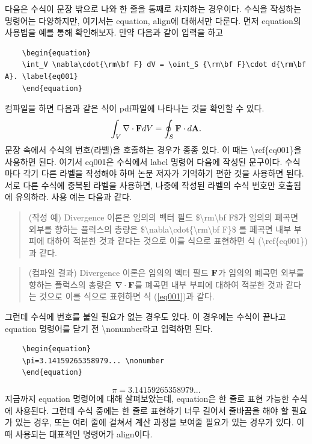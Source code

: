 \documentclass[twoside,11pt]{gshs_thesis}
\begin{document}
다음은 수식이 문장 밖으로 나와 한 줄을 통째로 차지하는 경우이다. 수식을 작성하는 명령어는 다양하지만, 여기서는 equation, align에 대해서만 다룬다. 먼저 equation의 사용법을 예를 통해 확인해보자. 만약 다음과 같이 입력을 하고
\begin{lstlisting}
	\begin{equation}
	\int_V \nabla\cdot{\rm\bf F} dV = \oint_S {\rm\bf F}\cdot d{\rm\bf A}. \label{eq001}
	\end{equation}
\end{lstlisting}
컴파일을 하면 다음과 같은 식이 pdf파일에 나타나는 것을 확인할 수 있다.
\begin{equation}
\int_V \nabla\cdot{\rm\bf F} dV = \oint_S {\rm\bf F}\cdot d{\rm\bf A}. \label{eq001}
\end{equation}
문장 속에서 수식의 번호(라벨)을 호출하는 경우가 종종 있다. 이 때는 {\textbackslash}ref\{eq001\}을 사용하면 된다. 여기서 eq001은 수식에서 label 명령어 다음에 작성된 문구이다. 수식마다 각기 다른 라벨을 작성해야 하며 논문 저자가 기억하기 편한 것을 사용하면 된다. 서로 다른 수식에 중복된 라벨을 사용하면, 나중에 작성된 라벨의 수식 번호만 호출됨에 유의하라. 사용 예는 다음과 같다.
\begin{quote}
(작성 예) Divergence 이론은 임의의 벡터 필드 \${\textbackslash}rm{\textbackslash}bf F\$가 임의의 폐곡면 외부를 향하는 플럭스의 총량은 \${\textbackslash}nabla{\textbackslash}cdot\{{\textbackslash}rm{\textbackslash}bf F\}\$ 를 폐곡면 내부 부피에 대하여 적분한 것과 같다는 것으로 이를 식으로 표현하면 식 ({\textbackslash}ref\{eq001\}) 과 같다.
\end{quote}
\begin{quote}
(컴파일 결과) Divergence 이론은 임의의 벡터 필드 $\rm\bf F$가 임의의 폐곡면 외부를 향하는 플럭스의 총량은 $\nabla\cdot{\rm\bf F}$를 폐곡면 내부 부피에 대하여 적분한 것과 같다는 것으로 이를 식으로 표현하면 식 (\ref{eq001})과 같다.
\end{quote}
그런데 수식에 번호를 붙일 필요가 없는 경우도 있다. 이 경우에는 수식이 끝나고 equation 명령어를 닫기 전 {\textbackslash}nonumber라고 입력하면 된다.
\begin{lstlisting}
	\begin{equation}
	\pi=3.14159265358979... \nonumber
	\end{equation}
\end{lstlisting}
\begin{equation}
\pi=3.14159265358979... \nonumber
\end{equation}
지금까지 equation 명령어에 대해 살펴보았는데, equation은 한 줄로 표현 가능한 수식에 사용된다. 그런데 수식 중에는 한 줄로 표현하기 너무 길어서 줄바꿈을 해야 할 필요가 있는 경우, 또는 여러 줄에 걸쳐서 계산 과정을 보여줄 필요가 있는 경우가 있다. 이 때 사용되는 대표적인 명령어가 align이다.
\end{document}
